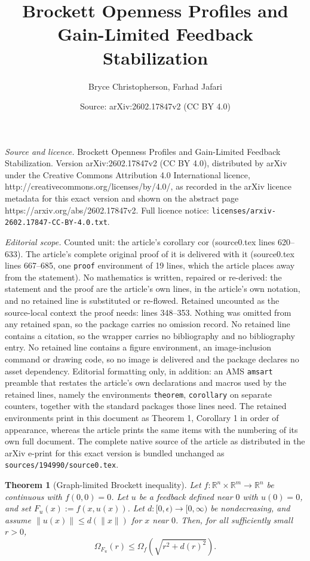 \documentclass[10pt,a4paper]{amsart}
\title{Brockett Openness Profiles and Gain-Limited Feedback Stabilization}
\author{Bryce Christopherson, Farhad Jafari}
\date{Source: arXiv:2602.17847v2 (CC BY 4.0)}
\newtheorem{theorem}{Theorem}
\begin{document}
\maketitle

\noindent\emph{Source and licence.} Brockett Openness Profiles and Gain-Limited Feedback Stabilization. Version arXiv:2602.17847v2 (CC BY 4.0), distributed by arXiv under the Creative Commons Attribution 4.0 International licence, http://creativecommons.org/licenses/by/4.0/, as recorded in the arXiv licence metadata for this exact version and shown on the abstract page https://arxiv.org/abs/2602.17847v2. Full licence notice: \texttt{licenses/arxiv-2602.17847-CC-BY-4.0.txt}.\par\smallskip

\noindent\textit{Editorial scope.} Counted unit: the article's corollary cor (source0.tex lines 620--633). The article's complete original proof of it is delivered with it (source0.tex lines 667--685, one \texttt{proof} environment of 19 lines, which the article places away from the statement). No mathematics is written, repaired or re-derived: the statement and the proof are the article's own lines, in the article's own notation, and no retained line is substituted or re-flowed.  Retained uncounted as the source-local context the proof needs: lines 348--353.  Nothing was omitted from any retained span, so the package carries no omission record.  No retained line contains a citation, so the wrapper carries no bibliography and no bibliography entry.  No retained line contains a figure environment, an image-inclusion command or drawing code, so no image is delivered and the package declares no asset dependency.  Editorial formatting only, in addition: an AMS \texttt{amsart} preamble that restates the article's own declarations and macros used by the retained lines, namely the environments \texttt{theorem}, \texttt{corollary} on separate counters, together with the standard packages those lines need.  The retained environments print in this document as Theorem 1, Corollary 1 in order of appearance, whereas the article prints the same items with the numbering of its own full document.  The complete native source of the article as distributed in the arXiv e-print for this exact version is bundled unchanged as \texttt{sources/194990/source0.tex}.
    \begin{theorem}[Graph-limited Brockett inequality]\label{graph limited brocket inequality}
        Let $f:\mathbb{R}^n\times\mathbb{R}^m\to\mathbb{R}^n$ be continuous with $f(0,0)=0$. Let $u$ be a feedback defined near $0$ with $u(0)=0$, and set $F_u(x):=f(x,u(x))$.  Let $d:[0,\epsilon)\to[0,\infty)$ be nondecreasing, and assume $\|u(x)\|\leq d(\|x\|)$ for $x$ near $0$.  Then, for all sufficiently small $r>0$, 
        \[
            \Omega_{F_u}(r) \leq \Omega_f\left(\sqrt{r^2+d(r)^2}\right).
        \]
    \end{theorem}
\end{document}
